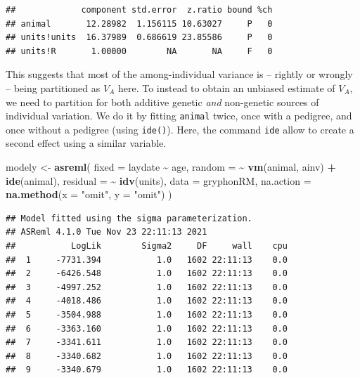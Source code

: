 \documentclass[
  12pt,
]{book}
\newenvironment{Shaded}{\begin{snugshade}}{\end{snugshade}}
\newcommand{\DataTypeTok}[1]{\textcolor[rgb]{0.13,0.29,0.53}{#1}}
\newcommand{\KeywordTok}[1]{\textcolor[rgb]{0.13,0.29,0.53}{\textbf{#1}}}
\newcommand{\NormalTok}[1]{#1}
\newcommand{\OperatorTok}[1]{\textcolor[rgb]{0.81,0.36,0.00}{\textbf{#1}}}
\newcommand{\StringTok}[1]{\textcolor[rgb]{0.31,0.60,0.02}{#1}}
\begin{document}
\begin{Shaded}
\end{Shaded}

\begin{verbatim}
##             component std.error  z.ratio bound %ch
## animal       12.28982  1.156115 10.63027     P   0
## units!units  16.37989  0.686619 23.85586     P   0
## units!R       1.00000        NA       NA     F   0
\end{verbatim}

This suggests that most of the among-individual variance is -- rightly or wrongly -- being partitioned as \(V_A\) here. To instead to obtain an unbiased estimate of \(V_A\), we need to partition for both additive genetic \emph{and} non-genetic sources of individual variation. We do it by fitting \texttt{animal} twice, once with a pedigree, and once without a pedigree (using \texttt{ide()}).
Here, the command \texttt{ide} allow to create a second effect using a similar variable.

\begin{Shaded}
\begin{Highlighting}[]
\NormalTok{modely \textless{}{-}}\StringTok{ }\KeywordTok{asreml}\NormalTok{(}
  \DataTypeTok{fixed =}\NormalTok{ laydate }\OperatorTok{\textasciitilde{}}\StringTok{ }\NormalTok{age,}
  \DataTypeTok{random =} \OperatorTok{\textasciitilde{}}\StringTok{ }\KeywordTok{vm}\NormalTok{(animal, ainv) }\OperatorTok{+}\StringTok{ }\KeywordTok{ide}\NormalTok{(animal),}
  \DataTypeTok{residual =} \OperatorTok{\textasciitilde{}}\StringTok{ }\KeywordTok{idv}\NormalTok{(units),}
  \DataTypeTok{data =}\NormalTok{ gryphonRM,}
  \DataTypeTok{na.action =} \KeywordTok{na.method}\NormalTok{(}\DataTypeTok{x =} \StringTok{"omit"}\NormalTok{, }\DataTypeTok{y =} \StringTok{"omit"}\NormalTok{)}
\NormalTok{)}
\end{Highlighting}
\end{Shaded}

\begin{verbatim}
## Model fitted using the sigma parameterization.
## ASReml 4.1.0 Tue Nov 23 22:11:13 2021
##           LogLik        Sigma2     DF     wall    cpu
##  1     -7731.394           1.0   1602 22:11:13    0.0
##  2     -6426.548           1.0   1602 22:11:13    0.0
##  3     -4997.252           1.0   1602 22:11:13    0.0
##  4     -4018.486           1.0   1602 22:11:13    0.0
##  5     -3504.988           1.0   1602 22:11:13    0.0
##  6     -3363.160           1.0   1602 22:11:13    0.0
##  7     -3341.611           1.0   1602 22:11:13    0.0
##  8     -3340.682           1.0   1602 22:11:13    0.0
##  9     -3340.679           1.0   1602 22:11:13    0.0
\end{verbatim}
\end{document}
